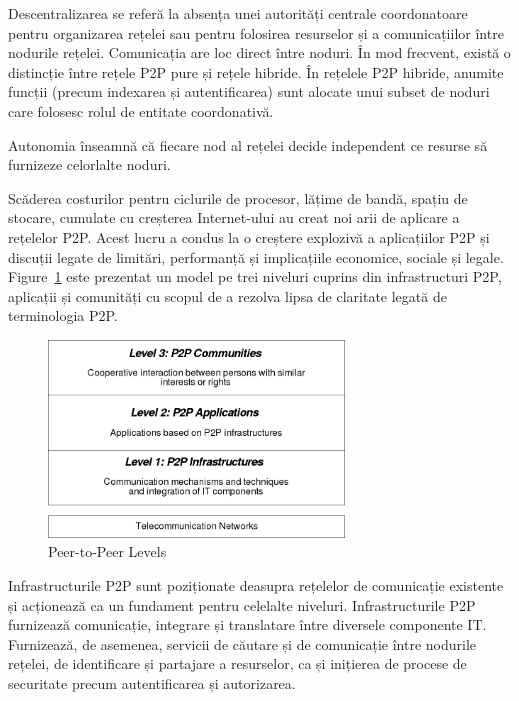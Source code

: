 Descentralizarea se referă la absența unei autorități centrale coordonatoare
pentru organizarea rețelei sau pentru folosirea resurselor și a comunicațiilor
între nodurile rețelei. Comunicația are loc direct între noduri. În mod
frecvent, există o distincție între rețele P2P pure și rețele hibride. În
rețelele P2P hibride, anumite funcții (precum indexarea și autentificarea)
sunt alocate unui subset de noduri care folosesc rolul de entitate
coordonativă.

Autonomia înseamnă că fiecare nod al rețelei decide independent ce resurse să
furnizeze celorlalte noduri.

Scăderea costurilor pentru ciclurile de procesor, lățime de bandă, spațiu de
stocare, cumulate cu creșterea Internet-ului au creat noi arii de aplicare a
rețelelor P2P. Acest lucru a condus la o creștere explozivă a aplicațiilor P2P
și discuții legate de limitări, performanță și implicațiile economice, sociale
și legale. Figure~\ref{fig:p2p-systems:p2p-levels} este prezentat un model pe
trei niveluri cuprins din infrastructuri P2P, aplicații și comunități cu
scopul de a rezolva lipsa de claritate legată de terminologia P2P.

\begin{figure}
  \centering
  \includegraphics[width=0.7\textwidth]{src/img/p2p-systems/p2p-levels}
  \caption{Peer-to-Peer Levels}
  \label{fig:p2p-systems:p2p-levels}
\end{figure}

Infrastructurile P2P sunt poziționate deasupra rețelelor de comunicație
existente și acționează ca un fundament pentru celelalte niveluri.
Infrastructurile P2P furnizează comunicație, integrare și translatare între
diversele componente IT. Furnizează, de asemenea, servicii de căutare și de
comunicație între nodurile rețelei, de identificare și partajare a resurselor,
ca și inițierea de procese de securitate precum autentificarea și autorizarea.

